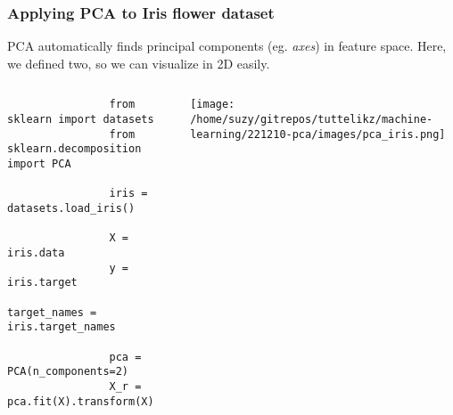 \documentclass{beamer}
\begin{document}
    \begin{frame}[fragile]
        \frametitle{Applying PCA to Iris flower dataset}
        PCA automatically finds principal components (eg. \textit{axes}) in feature space. Here, we defined two, so we can visualize in 2D easily.
        \begin{columns}
            \begin{column}{0.5\textwidth}
                \scriptsize
                \begin{verbatim}
                from sklearn import datasets
                from sklearn.decomposition import PCA

                iris = datasets.load_iris()

                X = iris.data
                y = iris.target
                target_names = iris.target_names

                pca = PCA(n_components=2)
                X_r = pca.fit(X).transform(X)
                \end{verbatim}
            \end{column}
            \begin{column}{0.5\textwidth}  %
                \begin{center}
                    \texttt{[image: /home/suzy/gitrepos/tuttelikz/machine-learning/221210-pca/images/pca\_iris.png]}
                 \end{center}
            \end{column}
        \end{columns}
    \end{frame}
\end{document}

